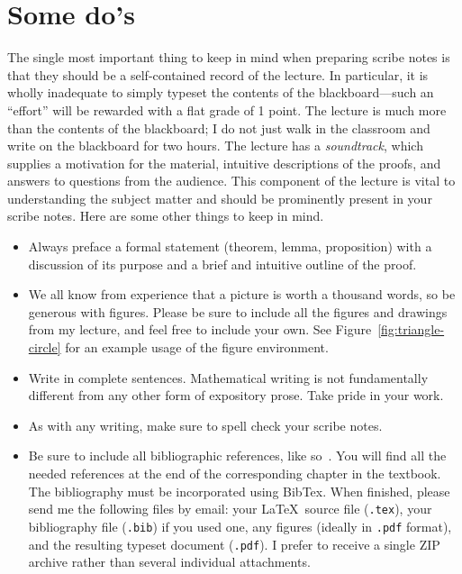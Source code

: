\documentclass[usletter]{article}
\begin{document}
\section{Some do's}
The single most important thing to keep in mind when
preparing scribe notes is that they should be a
self-contained record of the lecture.  In
particular, it is wholly inadequate to simply typeset
the contents of the blackboard---such an ``effort'' will
be rewarded with a flat grade of 1 point.  The lecture
is much more than the contents of the
blackboard; I do not just walk in the classroom and
write on the blackboard for two hours. The lecture has
a \emph{soundtrack}, which supplies a motivation for
the material, intuitive descriptions of the proofs, and
answers to questions from the audience.  This component
of the lecture is vital to understanding the subject
matter and should be prominently present in your scribe
notes.  Here are some other things to keep in mind.

\begin{itemize}
\item Always preface a formal statement (theorem,
lemma, proposition) with a discussion of its purpose
and a brief and intuitive outline of the proof.

\item We all know from experience that a picture is
worth a thousand words, so be generous with figures.
Please be sure to include all the figures and drawings
from my lecture, and feel free to include your own. See
Figure~\ref{fig:triangle-circle} for an example usage
of the figure environment.

\item Write in complete sentences.  Mathematical
writing is not fundamentally different from any other
form of expository prose. Take pride in your work.

\item As with any writing, make sure to spell check
your scribe notes.

\item Be sure to include all bibliographic references,
like so~\cite{textbook}. You will find all the needed
references at the end of the corresponding chapter in the
textbook. The bibliography must be incorporated using
BibTex.  When finished, please send me the following
files by email: your \LaTeX\ source file ({\tt .tex}),
your bibliography file ({\tt .bib}) if you used one,
any figures (ideally in {\tt .pdf} format), and the
resulting typeset document ({\tt .pdf}).   I prefer to
receive a single ZIP archive rather than several
individual attachments.
\end{itemize}
\end{document}

